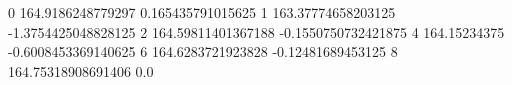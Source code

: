 0 164.9186248779297 0.165435791015625
1 163.37774658203125 -1.3754425048828125
2 164.59811401367188 -0.1550750732421875
4 164.15234375 -0.6008453369140625
6 164.6283721923828 -0.12481689453125
8 164.75318908691406 0.0
